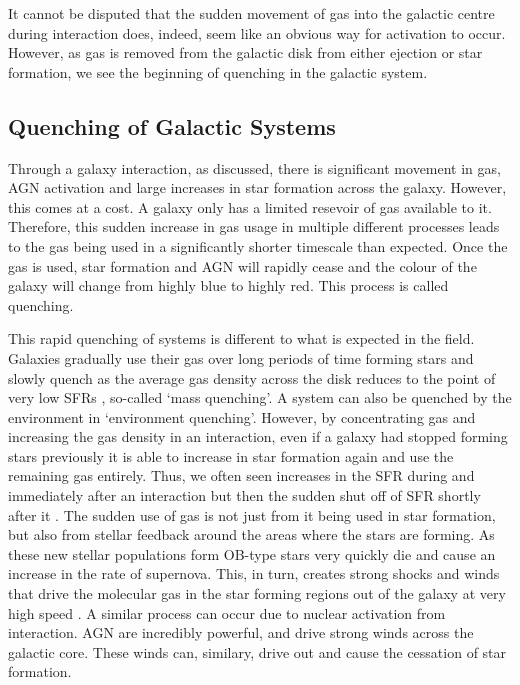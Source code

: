 It cannot be disputed that the sudden movement of gas into the galactic centre during interaction does, indeed, seem like an obvious way for activation to occur. However, as gas is removed from the galactic disk from either ejection or star formation, we see the beginning of quenching in the galactic system. 

\subsection{Quenching of Galactic Systems}
\noindent Through a galaxy interaction, as discussed, there is significant movement in gas, AGN activation and large increases in star formation across the galaxy. However, this comes at a cost. A galaxy only has a limited resevoir of gas available to it. Therefore, this sudden increase in gas usage in multiple different processes leads to the gas being used in a significantly shorter timescale than expected. Once the gas is used, star formation and AGN will rapidly cease and the colour of the galaxy will change from highly blue to highly red. This process is called quenching.

This rapid quenching of systems is different to what is expected in the field. Galaxies gradually use their gas over long periods of time forming stars and slowly quench as the average gas density across the disk reduces to the point of very low SFRs \citep{2010ApJ...721..193P}, so-called `mass quenching'. A system can also be quenched by the environment in `environment quenching'. However, by concentrating gas and increasing the gas density in an interaction, even if a galaxy had stopped forming stars previously it is able to increase in star formation again and use the remaining gas entirely. Thus, we often seen increases in the SFR during and immediately after an interaction but then the sudden shut off of SFR shortly after it \citep{2022MNRAS.517L..92E}. The sudden use of gas is not just from it being used in star formation, but also from stellar feedback around the areas where the stars are forming. As these new stellar populations form OB-type stars very quickly die and cause an increase in the rate of supernova. This, in turn, creates strong shocks and winds that drive the molecular gas in the star forming regions out of the galaxy at very high speed \citep{2013Natur.499..450B, 2018ApJ...864L...1G}. A similar process can occur due to nuclear activation from interaction. AGN are incredibly powerful, and drive strong winds across the galactic core. These winds can, similary, drive out \citep{2014A&A...562A..21C,  	2016Natur.533..504C, 2018MNRAS.480.3993B} and cause the cessation of star formation.

